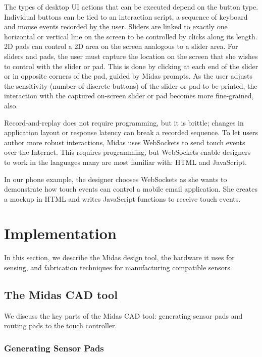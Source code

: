 The types of desktop UI actions that can be executed depend
on the button type. Individual buttons can be tied to an interaction
script, a sequence of keyboard and mouse events
recorded by the user. Sliders are linked to exactly one horizontal
or vertical line on the screen to be controlled by clicks
along its length. 2D pads can control a 2D area on the screen
analogous to a slider area. For sliders and pads, the user must
capture the location on the screen that she wishes to control
with the slider or pad. This is done by clicking at each end
of the slider or in opposite corners of the pad, guided by Midas
prompts. As the user adjusts the sensitivity (number of
discrete buttons) of the slider or pad to be printed, the interaction
with the captured on-screen slider or pad becomes
more fine-grained, also.

Record-and-replay does not require programming, but it is
brittle; changes in application layout or response latency can
break a recorded sequence. To let users author more robust
interactions, Midas uses WebSockets to send touch events
over the Internet. This requires programming, but WebSockets
enable designers to work in the languages many are most
familiar with: HTML and JavaScript.

In our phone example, the designer chooses WebSockets as
she wants to demonstrate how touch events can control a mobile
email application. She creates a mockup in HTML and
writes JavaScript functions to receive touch events.

\section{Implementation}

In this section, we describe the Midas design tool, the hardware it uses for sensing, and fabrication techniques for manufacturing compatible sensors. 

    \subsection{The Midas CAD tool}
    
    We discuss the key parts of the Midas CAD tool: generating sensor pads and routing pads to the touch controller.

        \subsubsection{Generating Sensor Pads}

